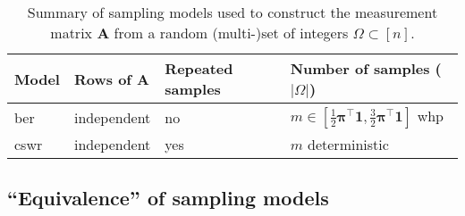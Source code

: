 \begin{table}[H]
    \begin{center}
        \begin{tabular}{ l l l l }
            \hline\noalign{\smallskip}
            Model & Rows of $\mathbf{A}$ & Repeated samples & Number of samples ($|\Omega|$) \\[.1cm]
            \hline\noalign{\smallskip}
            \acrshort{ber} & independent & no & $m \in \left[ \frac{1}{2}\bm{\pi}^{\top} \mathbf{1}, \frac{3}{2}\bm{\pi}^{\top} \mathbf{1} \right ]$ \acrshort{whp} \\[.25cm]
            \acrshort{cswr} & independent & yes & $m$ deterministic \\[.1cm]
            \hline
        \end{tabular}
    \end{center}
    \caption[Summary of sampling models]{Summary of sampling models used to construct the measurement matrix $\mathbf{A}$ from a random (multi-)set of integers $\Omega \subset [n]$.}
    \label{tab:sampling-models}
\end{table}

\clearpage

\begin{subappendices}
    \section{``Equivalence'' of sampling models}\label{ap:proof_equiv}
    
\end{subappendices}
